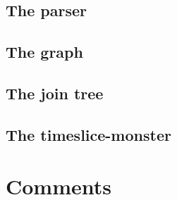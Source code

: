 \documentclass[12pt,a4paper]{report}
\begin{document}
\section{The parser}

\section{The graph}

\section{The join tree}

\section{The timeslice-monster}


\newpage
\chapter{Comments}


\newpage
%
\end{document}
